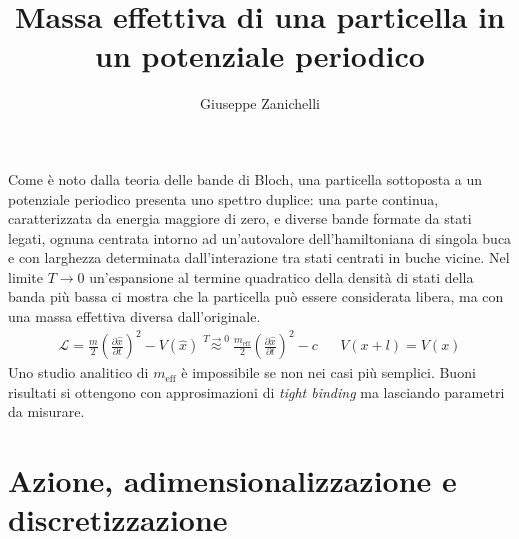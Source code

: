 \documentclass[italian]{article}
\title{Massa effettiva di una particella in un potenziale periodico}
\author{Giuseppe Zanichelli}
\newcommand{\approxusing}[1]{\stackrel{#1}{\approx}}
\newcommand{\lagrangian}{\mathcal{L}}
\newcommand{\ox}{\hat{x}}
\newcommand{\meff}{m_{\mathrm{eff}}}
\newcommand{\deriv}[2]{\frac{\partial #1}{\partial #2}}
\begin{document}
    Come è noto dalla teoria delle bande di Bloch, una particella sottoposta a un potenziale periodico presenta uno spettro duplice: una parte continua, caratterizzata da energia maggiore di zero, e diverse bande formate da stati legati, ognuna centrata intorno ad un'autovalore dell'hamiltoniana di singola buca e con larghezza determinata dall'interazione tra stati centrati in buche vicine.
    Nel limite $T\to0$ un'espansione al termine quadratico della densità di stati della banda più bassa ci mostra che la particella può essere considerata libera, ma con una massa effettiva diversa dall'originale.
    \begin{align}
        \lagrangian = \frac{m}{2}\left(\deriv{\ox}{t}\right)^2 - V(\ox) \approxusing{T \to 0} \frac{\meff}{2}\left(\deriv{\ox}{t}\right)^2 - c && V(x+l) = V(x) 
    \end{align}
    Uno studio analitico di $\meff$ è impossibile se non nei casi più semplici. Buoni risultati si ottengono con approsimazioni di \textit{tight binding} ma lasciando parametri da misurare. 
    
\section{Azione, adimensionalizzazione e discretizzazione} 
\end{document}

